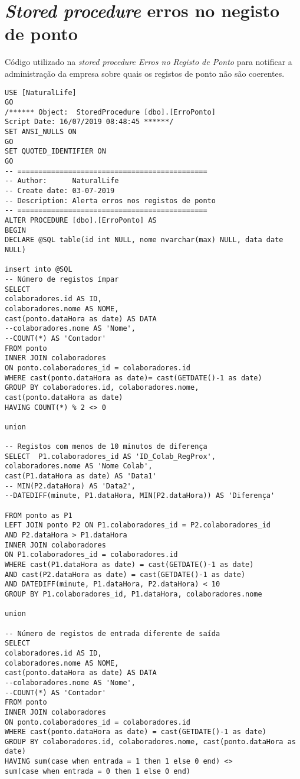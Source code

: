 \chapter{\textit{Stored procedure} erros no negisto de ponto}
\label{anexo:E}
Código utilizado na \textit{stored procedure Erros no Registo de Ponto} para notificar a administração da empresa sobre quais os registos de ponto não são coerentes.

\begin{verbatim}
USE [NaturalLife]
GO
/****** Object:  StoredProcedure [dbo].[ErroPonto]    
Script Date: 16/07/2019 08:48:45 ******/
SET ANSI_NULLS ON
GO
SET QUOTED_IDENTIFIER ON
GO
-- =============================================
-- Author:		NaturalLife
-- Create date: 03-07-2019
-- Description:	Alerta erros nos registos de ponto
-- =============================================
ALTER PROCEDURE [dbo].[ErroPonto] AS
BEGIN
DECLARE @SQL table(id int NULL, nome nvarchar(max) NULL, data date NULL)

insert into @SQL
-- Número de registos ímpar
SELECT
colaboradores.id AS ID,
colaboradores.nome AS NOME,
cast(ponto.dataHora as date) AS DATA
--colaboradores.nome AS 'Nome',
--COUNT(*) AS 'Contador'
FROM ponto
INNER JOIN colaboradores
ON ponto.colaboradores_id = colaboradores.id
WHERE cast(ponto.dataHora as date)= cast(GETDATE()-1 as date)
GROUP BY colaboradores.id, colaboradores.nome, 
cast(ponto.dataHora as date)
HAVING COUNT(*) % 2 <> 0

union

-- Registos com menos de 10 minutos de diferença
SELECT  P1.colaboradores_id AS 'ID_Colab_RegProx',
colaboradores.nome AS 'Nome Colab',
cast(P1.dataHora as date) AS 'Data1'
-- MIN(P2.dataHora) AS 'Data2',
--DATEDIFF(minute, P1.dataHora, MIN(P2.dataHora)) AS 'Diferença'

FROM ponto as P1
LEFT JOIN ponto P2 ON P1.colaboradores_id = P2.colaboradores_id
AND P2.dataHora > P1.dataHora
INNER JOIN colaboradores
ON P1.colaboradores_id = colaboradores.id
WHERE cast(P1.dataHora as date) = cast(GETDATE()-1 as date)
AND cast(P2.dataHora as date) = cast(GETDATE()-1 as date)
AND DATEDIFF(minute, P1.dataHora, P2.dataHora) < 10
GROUP BY P1.colaboradores_id, P1.dataHora, colaboradores.nome

union

-- Número de registos de entrada diferente de saída
SELECT
colaboradores.id AS ID,
colaboradores.nome AS NOME,
cast(ponto.dataHora as date) AS DATA
--colaboradores.nome AS 'Nome',
--COUNT(*) AS 'Contador'
FROM ponto
INNER JOIN colaboradores
ON ponto.colaboradores_id = colaboradores.id
WHERE cast(ponto.dataHora as date) = cast(GETDATE()-1 as date)
GROUP BY colaboradores.id, colaboradores.nome, cast(ponto.dataHora as date)
HAVING sum(case when entrada = 1 then 1 else 0 end) <> 
sum(case when entrada = 0 then 1 else 0 end)


\end{verbatim}
